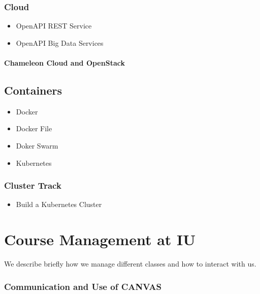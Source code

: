 \begin{itemize}
\subsection{Cloud}

\begin{itemize}
\item OpenAPI REST Service
\item OpenAPI Big Data Services
\end{itemize}

\subsubsection{Chameleon Cloud and OpenStack}



\section{Containers}

\begin{itemize}
\item Docker 
\item Docker File
\item Doker Swarm
\item Kubernetes
\end{itemize}

\subsection{Cluster Track}

\begin{itemize}
\item Build a Kubernetes Cluster
\end{itemize}

\chapter{Course Management at IU}

We describe briefly how we manage different classes and how to
interact with us. 

\subsection{Communication and Use of CANVAS}


\end{itemize}
